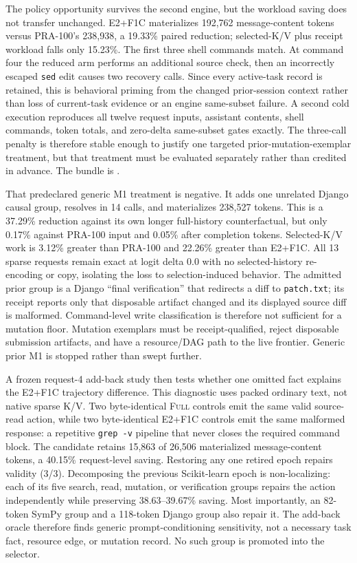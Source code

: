 \documentclass[11pt]{article}
\begin{document}
The policy opportunity survives the second engine, but the workload saving
does not transfer unchanged.  E2+F1C materializes 192,762 message-content
tokens versus PRA-100's 238,938, a 19.33\% paired reduction; selected-K/V plus
receipt workload falls only 15.23\%.  The first three shell commands match.
At command four the reduced arm performs an additional source check, then an
incorrectly escaped \texttt{sed} edit causes two recovery calls.  Since every
active-task record is retained, this is behavioral priming from the changed
prior-session context rather than loss of current-task evidence or an engine
same-subset failure.  A second cold execution reproduces all twelve request
inputs, assistant contents, shell commands, token totals, and zero-delta
same-subset gates exactly.  The three-call penalty is therefore stable enough
to justify one targeted prior-mutation-exemplar treatment, but that treatment
must be evaluated separately rather than credited in advance.  The bundle is
.

That predeclared generic M1 treatment is negative.  It adds one unrelated
Django causal group, resolves in 14 calls, and materializes 238,527 tokens.
This is a 37.29\% reduction against its own longer full-history
counterfactual, but only 0.17\% against PRA-100 input and 0.05\% after
completion tokens.  Selected-K/V work is 3.12\% greater than PRA-100 and
22.26\% greater than E2+F1C.  All 13 sparse requests remain exact at logit
delta 0.0 with no selected-history re-encoding or copy, isolating the loss to
selection-induced behavior.  The admitted prior group is a Django
``final verification'' that redirects a diff to \texttt{patch.txt}; its
receipt reports only that disposable artifact changed and its displayed
source diff is malformed.  Command-level write classification is therefore
not sufficient for a mutation floor.  Mutation exemplars must be
receipt-qualified, reject disposable submission artifacts, and have a
resource/DAG path to the live frontier.  Generic prior M1 is stopped rather
than swept further.

A frozen request-4 add-back study then tests whether one omitted fact explains
the E2+F1C trajectory difference.  This diagnostic uses packed ordinary text,
not native sparse K/V.  Two byte-identical \textsc{Full} controls emit the same
valid source-read action, while two byte-identical E2+F1C controls emit the
same malformed response: a repetitive \texttt{grep -v} pipeline that never
closes the required command block.  The candidate retains 15,863 of 26,506
materialized message-content tokens, a 40.15\% request-level saving.  Restoring
any one retired epoch repairs validity (3/3).  Decomposing the previous
Scikit-learn epoch is non-localizing: each of its five search, read, mutation,
or verification groups repairs the action independently while preserving
38.63--39.67\% saving.  Most importantly, an 82-token SymPy group and a
118-token Django group also repair it.  The add-back oracle therefore finds
generic prompt-conditioning sensitivity, not a necessary task fact, resource
edge, or mutation record.  No such group is promoted into the selector.
\end{document}
